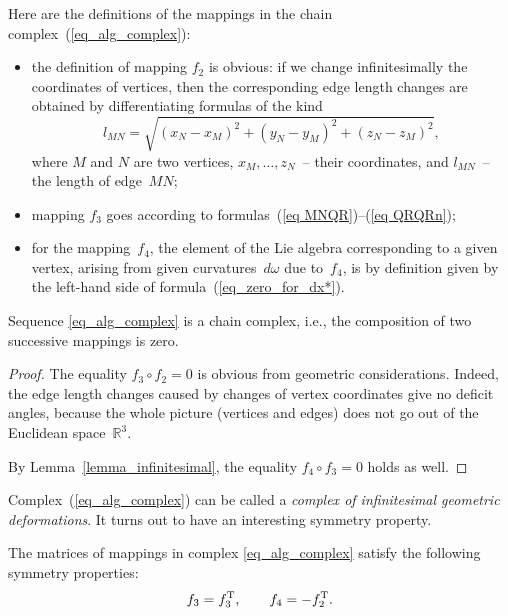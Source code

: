 \documentclass[pdftex]{sigma}
\begin{document}
Here are the def\/initions of the mappings in the chain complex~(\ref{eq_alg_complex}):
\begin{itemize}
\itemsep=0pt
\item the def\/inition of mapping $f_2$ is obvious: if we change inf\/initesimally the coordinates of vertices, then the corresponding edge length changes are obtained by dif\/ferentiating formulas of the kind
\begin{equation}
l_{MN} = \sqrt{(x_N-x_M)^2+(y_N-y_M)^2+(z_N-z_M)^2},
\label{eq_1a}
\end{equation}
where $M$ and $N$ are two vertices, $x_M,\ldots,z_N$~-- their coordinates, and $l_{MN}$~-- the length of edge~$MN$;
\item mapping $f_3$ goes according to formulas~(\ref{eq MNQR})--(\ref{eq QRQRn});
\item for the mapping~$f_4$, the element of the Lie algebra corresponding to a given vertex, arising from given curvatures~$d\omega$ due to~$f_4$, is by def\/inition given by the left-hand side of formula~(\ref{eq_zero_for_dx*}).
\end{itemize}


\begin{theorem}
Sequence \eqref{eq_alg_complex} is a chain complex, i.e., the composition of two successive mappings is zero.
\label{th2}
\end{theorem}

\begin{proof}
The equality $f_3 \circ f_2 = 0$ is obvious from geometric considerations. Indeed, the edge length changes caused by changes of vertex coordinates give no def\/icit angles, because the whole picture (vertices and edges) does not go out of the Euclidean space~$\mathbb R^3$.

By Lemma~\ref{lemma_infinitesimal}, the equality $f_4 \circ f_3 = 0$ holds as well.
\end{proof}

Complex~(\ref{eq_alg_complex}) can be called a \emph{complex of infinitesimal geometric deformations}. It turns out to have an interesting symmetry property.
\begin{theorem}\label{th_symmetry}
The matrices of mappings in complex \eqref{eq_alg_complex} satisfy the following symmetry properties:
\begin{equation}
f_3 = f_3^{\rm T},\qquad f_4 = - f_2^{\rm T}.
\label{eq_symmetry}
\end{equation}
\end{theorem}
\end{document}
